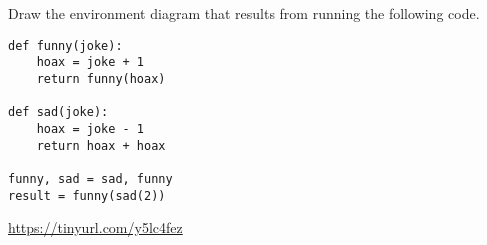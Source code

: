 \question Draw the environment diagram that results from running the following code.

\begin{lstlisting}
def funny(joke):
    hoax = joke + 1
    return funny(hoax)

def sad(joke):
    hoax = joke - 1
    return hoax + hoax

funny, sad = sad, funny
result = funny(sad(2))
\end{lstlisting}

\begin{solution}[2in]
\url{https://tinyurl.com/y5lc4fez}
\end{solution}